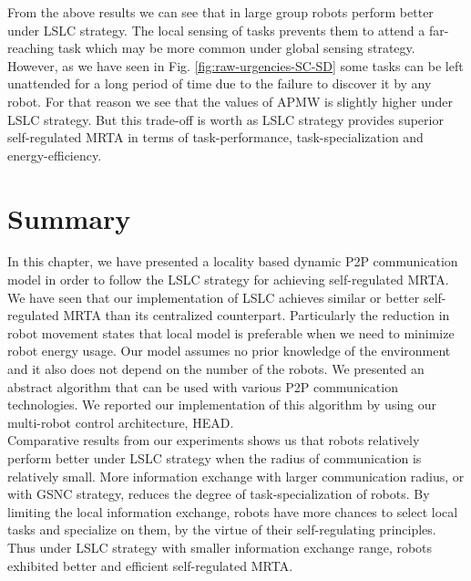 From the above results we can see that in large group robots perform better under LSLC strategy. The local sensing of tasks prevents them to attend a far-reaching task which may be more common under global sensing strategy. However, as we have seen in Fig. \ref{fig:raw-urgencies-SC-SD}
some tasks can be left unattended for a long period of time due to the failure to discover it by any robot. For that reason we see that the values of APMW is slightly higher under LSLC strategy. But this trade-off is worth as LSLC strategy provides superior self-regulated MRTA in terms of task-performance, task-specialization and energy-efficiency.
\section{Summary}
\label{loacl-comm:summary}
In this chapter, we have presented a locality based dynamic P2P communication model in order to follow the LSLC strategy for achieving self-regulated MRTA. We have seen that our implementation of LSLC achieves similar or better self-regulated MRTA than its centralized counterpart. Particularly the reduction in robot movement states that local model is preferable when we need to minimize robot energy usage. Our model assumes no prior knowledge of the environment and it also does not depend on the number of the robots. We presented an abstract algorithm that can be used with various P2P communication technologies. We reported our implementation of this algorithm by using our multi-robot control architecture, HEAD.\\
Comparative results from our experiments shows us that robots relatively perform better under LSLC strategy when the radius of communication is relatively small. More information exchange with larger communication radius, or with GSNC strategy, reduces the degree of task-specialization of robots. By limiting the local information exchange, robots have more chances to select local tasks and specialize on them, by the virtue of their self-regulating principles. Thus under LSLC strategy with smaller information exchange range, robots exhibited better and efficient self-regulated MRTA.